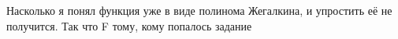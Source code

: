 \documentclass[../main.tex]{subfiles}
\begin{document}
Насколько я понял функция уже в виде полинома Жегалкина, и упростить её не получится. Так что F тому, кому попалось задание



\end{document}
